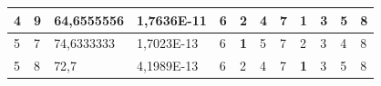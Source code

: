 \documentclass[conference]{IEEEtran}
\begin{document}
\begin{table}[]
\begin{tabular}{|llll|llllllll|}
\multicolumn{1}{|l|}{4}                                                     & \multicolumn{1}{l|}{9}                                                        & \multicolumn{1}{l|}{64,6555556}                                                   & 1,7636E-11                     & \multicolumn{1}{l|}{6}                                                  & \multicolumn{1}{l|}{2}                                                  & \multicolumn{1}{l|}{4}                                                  & \multicolumn{1}{l|}{7}                                                  & \multicolumn{1}{l|}{\textbf{1}}                                         & \multicolumn{1}{l|}{3}                                                  & \multicolumn{1}{l|}{5}                                                  & 8                          \\ \hline
\multicolumn{1}{|l|}{5}                                                     & \multicolumn{1}{l|}{7}                                                        & \multicolumn{1}{l|}{74,6333333}                                                   & 1,7023E-13                     & \multicolumn{1}{l|}{6}                                                  & \multicolumn{1}{l|}{\textbf{1}}                                         & \multicolumn{1}{l|}{5}                                                  & \multicolumn{1}{l|}{7}                                                  & \multicolumn{1}{l|}{2}                                                  & \multicolumn{1}{l|}{3}                                                  & \multicolumn{1}{l|}{4}                                                  & 8                          \\ \hline
\multicolumn{1}{|l|}{5}                                                     & \multicolumn{1}{l|}{8}                                                        & \multicolumn{1}{l|}{72,7}                                                         & 4,1989E-13                     & \multicolumn{1}{l|}{6}                                                  & \multicolumn{1}{l|}{2}                                                  & \multicolumn{1}{l|}{4}                                                  & \multicolumn{1}{l|}{7}                                                  & \multicolumn{1}{l|}{\textbf{1}}                                         & \multicolumn{1}{l|}{3}                                                  & \multicolumn{1}{l|}{5}                                                  & 8                          \\ \hline

\end{tabular}
\end{table}
\end{document}
